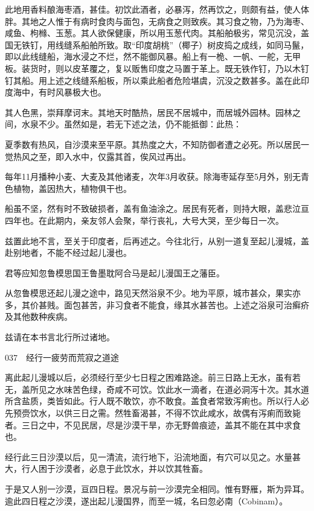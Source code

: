 \documentclass[12pt,UTF8]{ctexbook}
\begin{document}
此地用香料酿海枣酒，甚佳。初饮此酒者，必暴泻，然再饮之，则颇有益，使人体胖。其地之人惟于有病时食肉与面包，无病食之则致疾。其习食之物，乃为海枣、咸鱼、枸橼、玉葱。其人欲保健康，所以用玉葱代肉。其船舶极劣，常见沉没，盖国无铁钉，用线缝系船舶所致。取“印度胡桃”（椰子）树皮捣之成线，如同马鬣，即以此线缝船，海水浸之不烂，然不能御风暴。船上有一桅、一帆、一舵，无甲板。装货时，则以皮革覆之，复以贩售印度之马置于革上。既无铁作钉，乃以木钉钉其船。用上述之线缝系船板，所以乘此船者危险堪虞，沉没之数甚多。盖在此印度海中，有时风暴极大也。

其人色黑，崇拜摩诃末。其地天时酷热，居民不居城中，而居城外园林。园林之间，水泉不少。虽然如是，若无下述之法，仍不能抵御：此热：

夏季数有热风，自沙漠来至平原。其热度之大，不知防御者遭之必死。所以居民一觉热风之至，即入水中，仅露其首，俟风过再出。

每年11月播种小麦、大麦及其他诸麦，次年3月收获。除海枣延存至5月外，别无青色植物，盖因热大，植物俱干也。

船虽不坚，然有时不致破损者，盖有鱼油涂之。居民有死者，则持大眼，盖悲泣亘四年也。在此期内，亲友邻人会聚，举行丧礼，大号大哭，至少每日一次。

兹置此地不言，至关于印度者，后再述之。今往北行，从别一道复至起儿漫城，盖赴别地者，不能不经过起儿漫也。

君等应知忽鲁模思国王鲁墨耽阿合马是起儿漫国王之藩臣。

从忽鲁模思还起儿漫之途中，路见天然浴泉不少。地为平原，城市甚众，果实亦多，其价甚贱。面包甚苦，非习食者不能食，缘其水甚苦也。上述之浴泉可治癣疥及其他数种疾病。

兹请在本书言北行所过诸地。





037　经行一疲劳而荒寂之道途

离此起儿漫城以后，必须经行至少七日程之困难路途。前三日路上无水，虽有若无，盖所见之水味苦色绿，奇咸不可饮。饮此水一滴者，在道必洞泻十次。其水道所含盐质，类皆如此。行人既不敢饮，亦不敢食。盖食者常致泻痢也。所以行人必先预赍饮水，以供三日之需。然牲畜渴甚，不得不饮此咸水，故偶有泻痢而致毙者。三日之中，不见民居，尽是沙漠干旱，亦无野兽痕迹，盖其不能在其中求食也。

经行此三日沙漠以后，见一清流，流行地下，沿流地面，有穴可以见之。水量甚大，行人困于沙漠者，必息于此饮水，并以饮其牲畜。

于是又人别一沙漠，亘四日程。景况与前一沙漠完全相同。惟有野雁，斯为异耳。逾此四日程之沙漠，遂出起儿漫国界，而至一城，名曰忽必南（Cobinam）。
\end{document}

